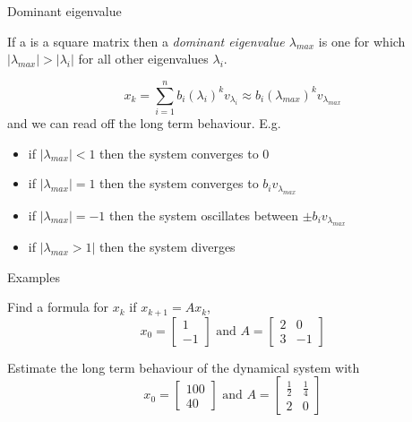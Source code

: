 \documentclass{beamer}
\begin{document}
\begin{frame}{Dominant eigenvalue}
\begin{definition}
	If a is a square matrix then a \emph{dominant eigenvalue $\lambda_{max}$} is one for which $|\lambda_{max}|>|\lambda_i|$ for all other eigenvalues $\lambda_i$.
\end{definition}
\begin{equation*}
x_k = \sum_{i=1}^n b_i (\lambda_i)^k v_{\lambda_i} \approx b_i (\lambda_{max})^k v_{\lambda_{max}}
\end{equation*}
and we can read off the long term behaviour. E.g.
\begin{itemize}
	\item if $|\lambda_{max}|< 1$ then the system converges to $0$
	\item if $|\lambda_{max}| = 1$ then the system converges to $b_iv_{\lambda_{max}}$
	\item if $|\lambda_{max}| = -1$ then the system oscillates between $\pm b_iv_{\lambda_{max}}$
	\item if $|\lambda_{max}>1|$ then the system diverges
\end{itemize}
\end{frame}

\begin{frame}{Examples}
\begin{example}
	Find a formula for $x_k$ if $x_{k+1} = Ax_k$,
	\begin{equation*}
	x_0 = \left[
	\begin{matrix}
	1\\
	-1
	\end{matrix}
	\right] \text{ and } A = \left[
	\begin{matrix}
	2&0\\
	3&-1
	\end{matrix}
	\right]
	\end{equation*}
\end{example}
\begin{example}
	Estimate the long term behaviour of the dynamical system with
	\begin{equation*}
	x_0 = \left[
	\begin{matrix}
	100\\
	40
	\end{matrix}
	\right] \text{ and }
	A = \left[
	\begin{matrix}
	\frac{1}{2}&\frac{1}{4}\\
	2&0
	\end{matrix}
	\right]
	\end{equation*}

\end{example}
\end{frame}
\end{document}
